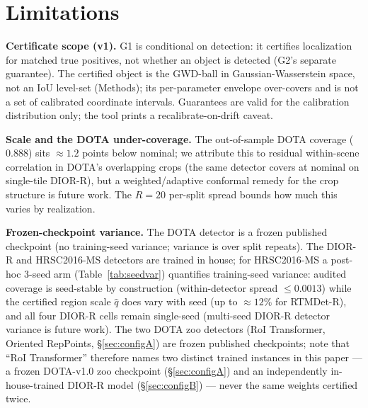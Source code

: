 \documentclass[journal]{IEEEtran}
\begin{document}
\section{Limitations}\label{sec:limitations}
\textbf{Certificate scope (v1).} G1 is conditional on detection: it certifies localization for matched
true positives, not whether an object is detected (G2's separate guarantee). The certified object is the
GWD-ball in Gaussian-Wasserstein space, not an IoU level-set (Methods); its per-parameter envelope
over-covers and is not a set of calibrated coordinate intervals. Guarantees are valid for the calibration
distribution only; the tool prints a recalibrate-on-drift caveat.

\textbf{Scale and the DOTA under-coverage.} The out-of-sample DOTA coverage ($0.888$) sits $\approx1.2$ points
below nominal; we attribute this to residual within-scene correlation in DOTA's overlapping crops (the same
detector covers at nominal on single-tile DIOR-R), but a weighted/adaptive conformal remedy for the crop
structure is future work. The $R{=}20$ per-split spread bounds how much this varies by realization.

\textbf{Frozen-checkpoint variance.} The DOTA detector is a frozen published checkpoint (no training-seed
variance; variance is over split repeats). The DIOR-R and HRSC2016-MS detectors are trained in house; for
HRSC2016-MS a post-hoc $3$-seed arm (Table~\ref{tab:seedvar}) quantifies training-seed variance: audited
coverage is seed-stable by construction (within-detector spread $\le0.0013$) while the certified region scale
$\hat q$ does vary with seed (up to $\approx12\%$ for RTMDet-R), and all four DIOR-R cells remain single-seed
(multi-seed DIOR-R detector variance is future work). The two DOTA zoo detectors (RoI Transformer, Oriented
RepPoints, \S\ref{sec:configA}) are frozen published checkpoints; note that ``RoI Transformer'' therefore
names two distinct trained instances in this paper --- a frozen DOTA-v1.0 zoo checkpoint (\S\ref{sec:configA})
and an independently in-house-trained DIOR-R model (\S\ref{sec:configB}) --- never the same weights certified
twice.
\end{document}
